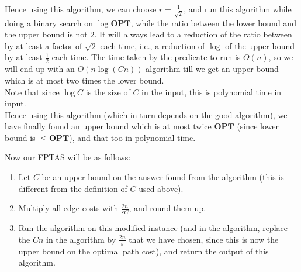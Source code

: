 \documentclass[a4paper]{article}
\newcommand{\nl}{\vspace{0.2cm}\\}
\newcommand{\eps}{\varepsilon}
\newcommand{\OPT}{\mathbf{OPT}}
\begin{document}
Hence using this algorithm, we can choose $r = \frac{1}{\sqrt{2}}$, and run this algorithm while doing a binary search on $\log \OPT$, while the ratio between the lower bound and the upper bound is
not $2$. It will always lead to a reduction of the ratio between by at least a factor of $\sqrt{2}$ each time, i.e., a reduction of $\log$ of the upper bound by at least $\frac{1}{2}$ each time.
The time taken by the predicate to run is $O(n)$, so we will end up with an $O(n \log (Cn))$ algorithm till we get an upper bound which is at most two times the lower bound.\nl
Note that since $\log C$ is the size of $C$ in the input, this is polynomial time in input.\nl
Hence using this algorithm (which in turn depends on the good algorithm), we have finally found an upper bound which is at most twice $\OPT$ (since lower bound is $\le \OPT$), and that too in
polynomial time.

Now our FPTAS will be as follows:

\begin{enumerate}
    \item Let $C$ be an upper bound on the answer found from the algorithm (this is different from the definition of $C$ used above).
    \item Multiply all edge costs with $\frac{2n}{\eps C}$, and round them up.
    \item Run the algorithm on this modified instance (and in the algorithm, replace the $Cn$ in the algorithm by $\frac{2n}{\eps}$ that we have chosen, since this is now the upper bound on the
        optimal path cost), and return the output of this algorithm.
\end{enumerate}
\end{document}

